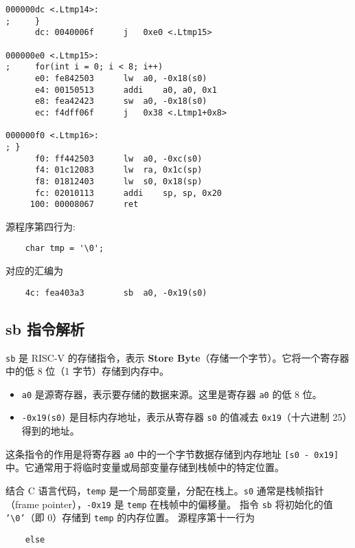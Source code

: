 \documentclass{ctexart}
\begin{document}
\begin{verbatim}
000000dc <.Ltmp14>:
;     }
      dc: 0040006f     	j	0xe0 <.Ltmp15>

000000e0 <.Ltmp15>:
;     for(int i = 0; i < 8; i++)
      e0: fe842503     	lw	a0, -0x18(s0)
      e4: 00150513     	addi	a0, a0, 0x1
      e8: fea42423     	sw	a0, -0x18(s0)
      ec: f4dff06f     	j	0x38 <.Ltmp1+0x8>

000000f0 <.Ltmp16>:
; }
      f0: ff442503     	lw	a0, -0xc(s0)
      f4: 01c12083     	lw	ra, 0x1c(sp)
      f8: 01812403     	lw	s0, 0x18(sp)
      fc: 02010113     	addi	sp, sp, 0x20
     100: 00008067     	ret

\end{verbatim}

源程序第四行为:

\begin{verbatim}
    char tmp = '\0';
\end{verbatim}
对应的汇编为

\begin{verbatim}
    4c: fea403a3     	sb	a0, -0x19(s0)
\end{verbatim}

\subsection*{sb 指令解析}
\texttt{sb} 是 RISC-V 的存储指令，表示 \textbf{Store Byte}（存储一个字节）。它将一个寄存器中的低 8 位（1 字节）存储到内存中。

\begin{itemize}
    \item \texttt{a0} 是源寄存器，表示要存储的数据来源。这里是寄存器 \texttt{a0} 的低 8 位。
    \item \texttt{-0x19(s0)} 是目标内存地址，表示从寄存器 \texttt{s0} 的值减去 \texttt{0x19}（十六进制 25）得到的地址。
\end{itemize}

这条指令的作用是将寄存器 \texttt{a0} 中的一个字节数据存储到内存地址 \texttt{[s0 - 0x19]} 中。它通常用于将临时变量或局部变量存储到栈帧中的特定位置。

结合 C 语言代码，\texttt{temp} 是一个局部变量，分配在栈上。\texttt{s0} 通常是栈帧指针（frame pointer），\texttt{-0x19} 是 \texttt{temp} 在栈帧中的偏移量。
指令 \texttt{sb} 将初始化的值 \texttt{'\textbackslash 0'}（即 0）存储到 \texttt{temp} 的内存位置。
源程序第十一行为

\begin{verbatim}
    else
\end{verbatim}
\end{document}
